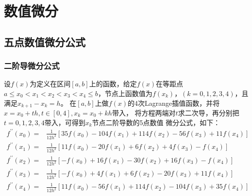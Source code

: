 \chapter{数值微分}
\section{五点数值微分公式}
\subsection{二阶导微分公式}
设$f(x)$为定义在区间$[a,b]$上的函数，给定$f(x)$在等距点$a \leqslant x_0 < x_1 < x_2 < x_3
< x_4 \leqslant b$，节点上函数值为$f(x_k)$，$(k=0, 1, 2, 3, 4)$，且满足$x_{k+1}-x_k=h$。
在$[a,b]$上做$f(x)$的4次Lagrange插值函数，并将$x=x_0+th, t \in [0, 4], x_k = x_0+kh$带入，
将方程两端对$t$求二次导，再分别把$t=0, 1, 2, 3, 4$带入，可得到$x_k$节点二阶导数的5点数值
微分公式，如下：
\begin{equation}
	\begin{aligned}
		f^{\prime\prime}(x_0) =& \frac{1}{12h^2}[35f(x_0) - 104f(x_1) + 114f(x_2) - 56f(x_3) + 11f(x_4)] \\
		f^{\prime\prime}(x_1) =& \frac{1}{12h^2}[11f(x_0) -  20f(x_1) +   6f(x_2) +  4f(x_3) -   f(x_4)] \\
		f^{\prime\prime}(x_2) =& \frac{1}{12h^2}[ -f(x_0) +  16f(x_1) -  30f(x_2) + 16f(x_3) -   f(x_4)] \\
		f^{\prime\prime}(x_3) =& \frac{1}{12h^2}[ -f(x_0) +   4f(x_1) +   6f(x_2) - 20f(x_3) + 11f(x_4)] \\
		f^{\prime\prime}(x_4) =& \frac{1}{12h^2}[11f(x_0) -  56f(x_1) + 114f(x_2) -104f(x_3) + 35f(x_4)]
	\end{aligned}
\end{equation} 




